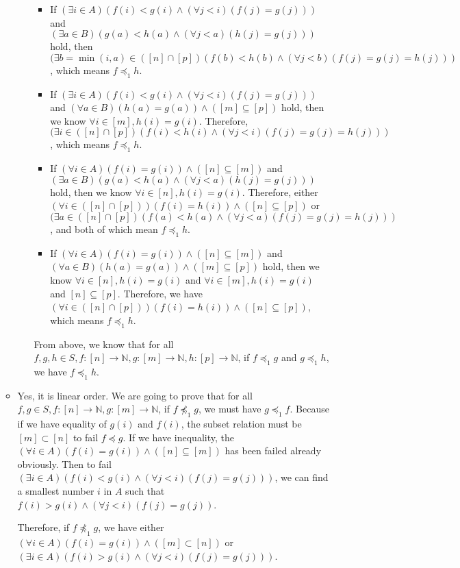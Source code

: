 \documentclass{article}[12pt]
\begin{document}
\begin{enumerate}[(i)]
\begin{itemize}
\begin{enumerate}
\begin{itemize}
\item If $(\exists i \in A)(f(i)<g(i) \wedge(\forall j<i)(f(j)=g(j)))$ and $(\exists a \in B)(g(a)<h(a) \wedge(\forall j<a)(h(j)=g(j)))$ hold, then $(\exists b=\min(i,a) \in ([n]\cap [p])(f(b)<h(b) \wedge(\forall j<b)(f(j)=g(j)=h(j)))$, which means $f\preceq_1 h$.
\item If $(\exists i \in A)(f(i)<g(i) \wedge(\forall j<i)(f(j)=g(j)))$ and $(\forall a \in B)(h(a)=g(a)) \wedge([m] \subseteq[p])$ hold, then we know $\forall i\in [m],h(i)=g(i).$ Therefore, 
$(\exists i \in ([n]\cap [p])(f(i)<h(i) \wedge(\forall j<i)(f(j)=g(j)=h(j)))$, which means $f\preceq_1 h$.
\item If $(\forall i \in A)(f(i)=g(i)) \wedge([n] \subseteq[m])$ and $(\exists a \in B)(g(a)<h(a) \wedge(\forall j<a)(h(j)=g(j)))$ hold, then we know $\forall i\in [n],h(i)=g(i).$ Therefore, either $(\forall i \in ([n]\cap [p]))(f(i)=h(i)) \wedge([n] \subseteq[p])$ or $(\exists a \in ([n]\cap [p])(f(a)<h(a) \wedge(\forall j<a)(f(j)=g(j)=h(j)))$, and both of which mean $f\preceq_1 h$.
\item If $(\forall i \in A)(f(i)=g(i)) \wedge([n] \subseteq[m])$ and $(\forall a \in B)(h(a)=g(a)) \wedge([m] \subseteq[p])$ hold, then we know $\forall i\in [n],h(i)=g(i)$ and  $\forall i\in [m],h(i)=g(i)$ and $[n]\subseteq [p]$. Therefore, we have $(\forall i \in ([n]\cap [p]))(f(i)=h(i)) \wedge([n] \subseteq[p])$, which means $f\preceq_1 h$.
\end{itemize}
From above, we know that for all $f,g,h\in S, f:[n]\rightarrow \mathbb{N},g:[m]\rightarrow \mathbb{N}, h:[p]\rightarrow \mathbb{N}$, if $f\preceq_1 g$ and $g\preceq_1 h$, we have $f\preceq_1 h$. 
\end{enumerate}
\item Yes, it is linear order. We are going to prove that for all $f,g\in S, f:[n]\rightarrow \mathbb{N},g:[m]\rightarrow \mathbb{N}$, if $f\not\preceq_1 g$, we must have $g\preceq_1 f$. Because if we have equality of $g(i)$ and $f(i)$, the subset relation must be $[m]\subset[n]$ to fail $f\preceq g$. If we have inequality, the $(\forall i \in A)(f(i)=g(i)) \wedge([n] \subseteq[m])$ has been failed already obviously. Then to fail $(\exists i \in A)(f(i)<g(i) \wedge(\forall j<i)(f(j)=g(j)))$, we can find a smallest number $i$ in $A$ such that $f(i)>g(i) \wedge(\forall j<i)(f(j)=g(j))$.\par 
Therefore, if $f\not\preceq_1 g$, we have either $(\forall i \in A)(f(i)=g(i)) \wedge([m] \subset[n])$ or $(\exists i \in A)(f(i)>g(i) \wedge(\forall j<i)(f(j)=g(j)))$. 

\end{itemize}
\end{enumerate}
\end{document}
